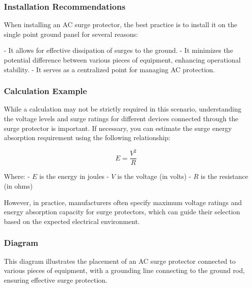 \subsubsection{Installation Recommendations}

When installing an AC surge protector, the best practice is to install it on the single point ground panel for several reasons:

- It allows for effective dissipation of surges to the ground.
- It minimizes the potential difference between various pieces of equipment, enhancing operational stability.
- It serves as a centralized point for managing AC protection.

\subsubsection{Calculation Example}

While a calculation may not be strictly required in this scenario, understanding the voltage levels and surge ratings for different devices connected through the surge protector is important. If necessary, you can estimate the surge energy absorption requirement using the following relationship:

\[
E = \frac{V^2}{R}
\]

Where:
- \(E\) is the energy in joules
- \(V\) is the voltage (in volts)
- \(R\) is the resistance (in ohms)

However, in practice, manufacturers often specify maximum voltage ratings and energy absorption capacity for surge protectors, which can guide their selection based on the expected electrical environment.

\subsubsection{Diagram}

\begin{center}
\end{center}

This diagram illustrates the placement of an AC surge protector connected to various pieces of equipment, with a grounding line connecting to the ground rod, ensuring effective surge protection.
